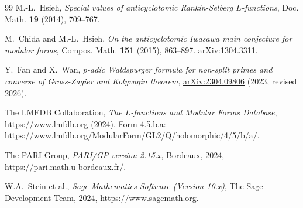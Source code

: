 \documentclass[12pt]{amsart}
\theoremstyle{definition}
\begin{document}
\begin{thebibliography}{99}
M.-L.~Hsieh,
\emph{Special values of anticyclotomic Rankin-Selberg $L$-functions},
Doc. Math. \textbf{19} (2014), 709--767.

M.~Chida and M.-L.~Hsieh,
\emph{On the anticyclotomic Iwasawa main conjecture for modular forms},
Compos. Math. \textbf{151} (2015), 863--897.
\href{https://arxiv.org/abs/1304.3311}{arXiv:1304.3311}.

Y.~Fan and X.~Wan,
\emph{$p$-adic {Waldspurger} formula for non-split primes and converse of {Gross-Zagier} and {Kolyvagin} theorem},
\href{https://arxiv.org/abs/2304.09806}{arXiv:2304.09806} (2023, revised 2026).

The LMFDB Collaboration,
\emph{The $L$-functions and Modular Forms Database},
\url{https://www.lmfdb.org} (2024).
Form 4.5.b.a: \url{https://www.lmfdb.org/ModularForm/GL2/Q/holomorphic/4/5/b/a/}.

The PARI Group,
\emph{PARI/GP version 2.15.x},
Bordeaux, 2024, \url{https://pari.math.u-bordeaux.fr/}.

W.A.~Stein et al.,
\emph{Sage Mathematics Software (Version 10.x)},
The Sage Development Team, 2024, \url{https://www.sagemath.org}.

\end{thebibliography}
\end{document}
